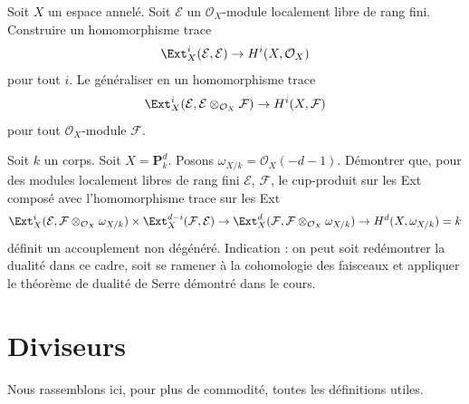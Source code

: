 \begin{exercise}
\label{exercise-trace-on-ext}
Soit $X$ un espace annelé. Soit $\mathcal{E}$ un
$\mathcal{O}_X$-module localement libre de rang fini. Construire un homomorphisme trace
$$
\Ext^i_X(\mathcal{E}, \mathcal{E}) \to H^i(X, \mathcal{O}_X)
$$
pour tout $i$. Le généraliser en un homomorphisme trace
$$
\Ext^i_X(\mathcal{E}, \mathcal{E} \otimes_{\mathcal{O}_X} \mathcal{F})
\to H^i(X, \mathcal{F})
$$
pour tout $\mathcal{O}_X$-module $\mathcal{F}$.
\end{exercise}

\begin{exercise}
\label{exercise-duality}
Soit $k$ un corps. Soit $X = \mathbf{P}^d_k$. Posons
$\omega_{X/k} = \mathcal{O}_X(-d - 1)$.
Démontrer que, pour des modules localement libres de rang fini
$\mathcal{E}$, $\mathcal{F}$, le cup-produit sur les Ext
composé avec l'homomorphisme trace sur les Ext
$$
\Ext^i_X(\mathcal{E}, \mathcal{F} \otimes_{\mathcal{O}_X} \omega_{X/k})
\times
\Ext^{d - i}_X(\mathcal{F}, \mathcal{E})
\to
\Ext_X^d(\mathcal{F}, \mathcal{F} \otimes_{\mathcal{O}_X} \omega_{X/k})
\to
H^d(X, \omega_{X/k}) = k
$$
définit un accouplement non dégénéré. Indication : on peut soit redémontrer la dualité
dans ce cadre, soit se ramener à la cohomologie des faisceaux et appliquer le
théorème de dualité de Serre démontré dans le cours.
\end{exercise}







\section{Diviseurs}
\label{section-divisors}

\noindent
Nous rassemblons ici, pour plus de commodité, toutes les définitions utiles.

